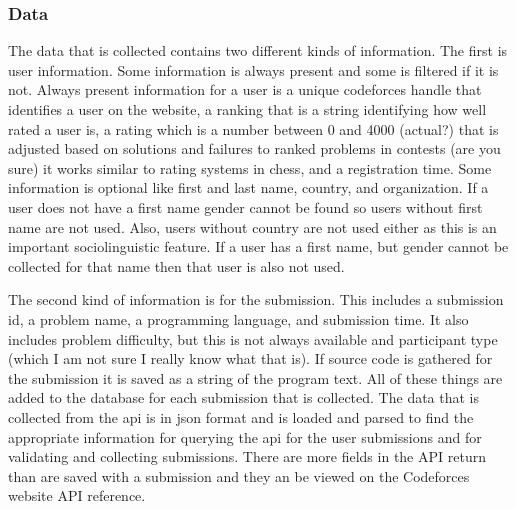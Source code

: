 \documentclass{article}
\begin{document}
\subsubsection*{Data}
The data that is collected contains two different kinds of information. The first is user information. Some information is always present and some is filtered if it is not. Always present information for a user is a unique codeforces handle that identifies a user on the website, a ranking that is a string identifying how well rated a user is, a rating which is a number between 0 and 4000 (actual?) that is adjusted based on solutions and failures to ranked problems in contests (are you sure) it works similar to rating systems in chess, and a registration time. Some information is optional like first and last name, country, and organization. If a user does not have a first name gender cannot be found so users without first name are not used. Also, users without country are not used either as this is an important sociolinguistic feature. If a user has a first name, but gender cannot be collected for that name then that user is also not used.

The second kind of information is for the submission. This includes a submission id, a problem name, a programming language, and submission time. It also includes problem difficulty, but this is not always available and participant type (which I am not sure I really know what that is). If source code is gathered for the submission it is saved as a string of the program text. All of these things are added to the database for each submission that is collected. The data that is collected from the api is in json format and is loaded and parsed to find the appropriate information for querying the api for the user submissions and for validating and collecting submissions. There are more fields in the API return than are saved with a submission and they an be viewed on the Codeforces website API reference.
\end{document}
